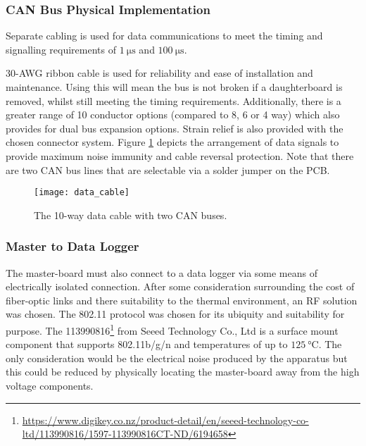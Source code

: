 \subsubsection{CAN Bus Physical Implementation}
Separate cabling is used for data communications to meet the timing and signalling requirements of $\SI{1}{\micro\second}$ and $\SI{100}{\micro\second}$.

30-AWG ribbon cable is used for reliability and ease of installation and maintenance.
Using this will mean the bus is not broken if a daughterboard is removed, whilst still meeting the timing requirements.
Additionally, there is a greater range of 10 conductor options (compared to 8, 6 or 4 way) which also provides for dual bus expansion options.
Strain relief is also provided with the chosen connector system.
Figure \ref{fig:data_cable} depicts the arrangement of data signals to provide maximum noise immunity and cable reversal protection.
Note that there are two CAN bus lines that are selectable via a solder jumper on the PCB.
\begin{figure}[H]
	\centering
	\texttt{[image: data\_cable]}
	\caption{The 10-way data cable with two CAN buses.}
	\label{fig:data_cable}
\end{figure}

\subsubsection{Master to Data Logger}

The master-board must also connect to a data logger via some means of electrically isolated connection.
After some consideration surrounding the cost of fiber-optic links and there suitability to the thermal environment, an RF solution was chosen.
The 802.11 protocol was chosen for its ubiquity and suitability for purpose.
The 113990816\footnote{\url{https://www.digikey.co.nz/product-detail/en/seeed-technology-co-ltd/113990816/1597-113990816CT-ND/6194658}} from Seeed Technology Co., Ltd is a surface mount component that supports 802.11b/g/n and temperatures of up to $\SI{125}{\degreeCelsius}$.
The only consideration would be the electrical noise produced by the apparatus but this could be reduced by physically locating the master-board away from the high voltage components.
